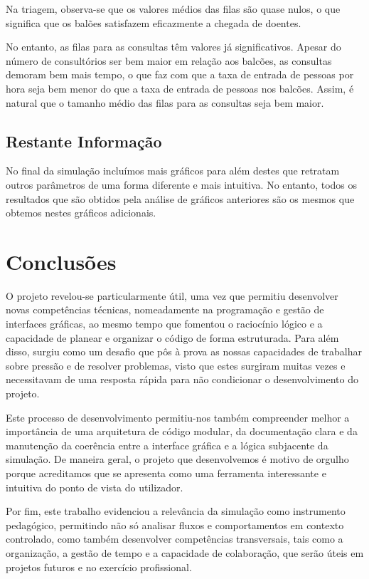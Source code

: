 \documentclass[12pt,a4paper]{article} %
\begin{document}
    \medskip
    Na triagem, observa-se que os valores médios das filas são quase nulos, o que significa que os balões satisfazem eficazmente a chegada de doentes.

    \medskip
    No entanto, as filas para as consultas têm valores já significativos. Apesar do número de consultórios ser bem maior em relação aos balcões, as consultas demoram bem mais tempo, o que faz com que a taxa de entrada de pessoas por hora seja bem menor do que a taxa de entrada de pessoas nos balcões. Assim, é natural que o tamanho médio das filas para as consultas seja bem maior.

    \medskip
    \subsection{Restante Informação}

    No final da simulação incluímos mais gráficos para além destes que retratam outros parâmetros de uma forma diferente e mais intuitiva. No entanto, todos os resultados que são obtidos pela análise de gráficos anteriores são os mesmos que obtemos nestes gráficos adicionais.
    
    \section{Conclusões}
O projeto revelou-se particularmente útil, uma vez que permitiu desenvolver novas competências técnicas, nomeadamente na programação e gestão de interfaces gráficas, ao mesmo tempo que fomentou o raciocínio lógico e a capacidade de planear e organizar o código de forma estruturada. Para além disso, surgiu como um desafio que pôs à prova as nossas capacidades de trabalhar sobre pressão e de resolver problemas, visto que estes surgiram muitas vezes e necessitavam de uma resposta rápida para não condicionar o desenvolvimento do projeto. 

Este processo de desenvolvimento permitiu-nos também compreender melhor a importância de uma arquitetura de código modular, da documentação clara e da manutenção da coerência entre a interface gráfica e a lógica subjacente da simulação. De maneira geral, o projeto que desenvolvemos é motivo de orgulho porque acreditamos que se apresenta como uma  ferramenta interessante e intuitiva do ponto de vista do utilizador.

Por fim, este trabalho evidenciou a relevância da simulação como instrumento pedagógico, permitindo não só analisar fluxos e comportamentos em contexto controlado, como também desenvolver competências transversais, tais como a organização, a gestão de tempo e a capacidade de colaboração, que serão úteis em projetos futuros e no exercício profissional.
\end{document}
